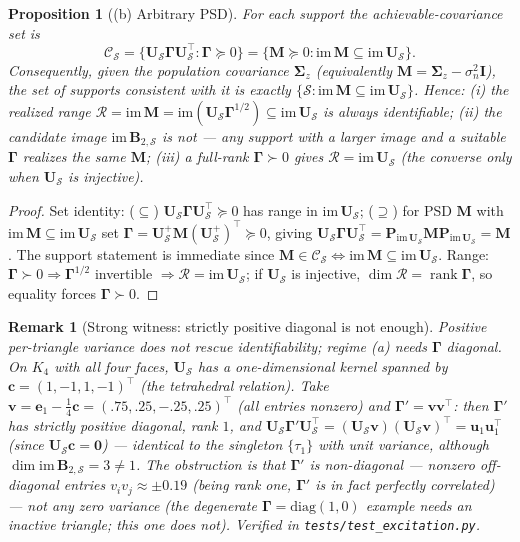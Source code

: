 \documentclass[11pt]{article}
\newtheorem{proposition}[theorem]{Proposition}
\newtheorem{remark}[theorem]{Remark}
\DeclareMathOperator{\rank}{rank}
\newcommand{\B}{\bm{B}}
\newcommand{\Scal}{\mathcal{S}}
\newcommand{\Rcal}{\mathcal{R}}
\newcommand{\Ccal}{\mathcal{C}}
\newcommand{\Gam}{\bm{\Gamma}}
\begin{document}
\begin{proposition}[(b) Arbitrary PSD]\label{prop:psd}
For each support the achievable-covariance set is
\[
\Ccal_\Scal=\{\bm U_\Scal\Gam\bm U_\Scal^{\!\top}:\Gam\succeq0\}
=\{\bm M\succeq0:\mathrm{im}\,\bm M\subseteq\mathrm{im}\,\bm U_\Scal\}.
\]
Consequently, given the \emph{population} covariance $\bm\Sigma_z$
(equivalently $\bm M=\bm\Sigma_z-\sigma_n^2\bm I$), the set of supports
consistent with it is exactly $\{\Scal:\mathrm{im}\,\bm M\subseteq\mathrm{im}\,\bm U_\Scal\}$.
Hence: \emph{(i)} the realized range $\Rcal=\mathrm{im}\,\bm M
=\mathrm{im}(\bm U_\Scal\Gam^{1/2})\subseteq\mathrm{im}\,\bm U_\Scal$ is always
identifiable; \emph{(ii)} the candidate image $\mathrm{im}\,\B_{2,\Scal}$ is
\emph{not} --- any support with a larger image and a suitable $\Gam$ realizes
the same $\bm M$; \emph{(iii)} a full-rank $\Gam\succ0$ gives $\Rcal=\mathrm{im}\,\bm U_\Scal$
(the converse only when $\bm U_\Scal$ is injective).
\end{proposition}
\begin{proof}
Set identity: ($\subseteq$) $\bm U_\Scal\Gam\bm U_\Scal^{\!\top}\succeq0$ has
range in $\mathrm{im}\,\bm U_\Scal$; ($\supseteq$) for PSD $\bm M$ with
$\mathrm{im}\,\bm M\subseteq\mathrm{im}\,\bm U_\Scal$ set
$\Gam=\bm U_\Scal^{+}\bm M(\bm U_\Scal^{+})^{\!\top}\succeq0$, giving
$\bm U_\Scal\Gam\bm U_\Scal^{\!\top}=\bm P_{\mathrm{im}\,\bm U_\Scal}\bm M\bm P_{\mathrm{im}\,\bm U_\Scal}=\bm M$.
The support statement is immediate since $\bm M\in\Ccal_\Scal\Leftrightarrow
\mathrm{im}\,\bm M\subseteq\mathrm{im}\,\bm U_\Scal$. Range: $\Gam\succ0\Rightarrow\Gam^{1/2}$
invertible $\Rightarrow\Rcal=\mathrm{im}\,\bm U_\Scal$; if $\bm U_\Scal$ is
injective, $\dim\Rcal=\rank\Gam$, so equality forces $\Gam\succ0$.
\end{proof}

\begin{remark}[Strong witness: strictly positive diagonal is not enough]\label{rem:strongwit}
Positive per-triangle variance does not rescue identifiability; regime (a)
needs $\Gam$ \emph{diagonal}. On $K_4$ with all four faces, $\bm U_\Scal$ has a
one-dimensional kernel spanned by $\bm c=(1,-1,1,-1)^{\!\top}$ (the tetrahedral
relation). Take $\bm v=\bm e_1-\tfrac14\bm c=(.75,.25,-.25,.25)^{\!\top}$
(all entries nonzero) and $\Gam'=\bm v\bm v^{\!\top}$: then $\Gam'$ has
\emph{strictly positive diagonal}, rank $1$, and
$\bm U_\Scal\Gam'\bm U_\Scal^{\!\top}=(\bm U_\Scal\bm v)(\bm U_\Scal\bm v)^{\!\top}
=\bm u_1\bm u_1^{\!\top}$ (since $\bm U_\Scal\bm c=\bm 0$) --- identical to the
singleton $\{\tau_1\}$ with unit variance, although $\dim\mathrm{im}\,\B_{2,\Scal}=3\ne1$.
The obstruction is that $\Gam'$ is non-diagonal --- nonzero off-diagonal
\emph{entries} $v_iv_j\approx\pm0.19$ (being rank one, $\Gam'$ is in fact
perfectly correlated) --- not any zero variance (the degenerate
$\Gam=\mathrm{diag}(1,0)$
example needs an inactive triangle; this one does not). Verified in
\texttt{tests/test\_excitation.py}.
\end{remark}
\end{document}
